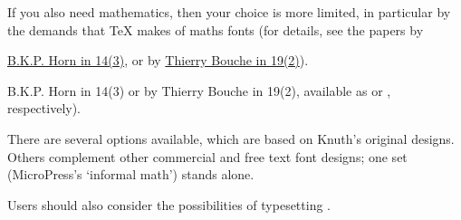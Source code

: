If you also need mathematics, then your choice is more limited, in
particular  by the
demands that \TeX{} makes of maths fonts (for details, see the papers
by
\begin{wideversion}
  \href{http://tug.org/TUGboat/Articles/tb14-3/tb40horn.pdf}{B.K.P. Horn in \TUGboat{} 14(3)},
  or by %
  \href{http://tug.org/TUGboat/Articles/tb19-2/tb59bouc.pdf}{Thierry Bouche in \TUGboat{} 19(2)}).
\end{wideversion}
\begin{narrowversion}
  B.K.P. Horn in \TUGboat{} 14(3) or by Thierry Bouche in \TUGboat{}
  19(2), available as
   or
  , respectively).
\end{narrowversion}
There are several options available, which are
based on Knuth's original designs.  Others complement other
commercial and free text font designs; one set (MicroPress's `informal math')
stands alone.

Users should also consider the possibilities of typesetting
.

